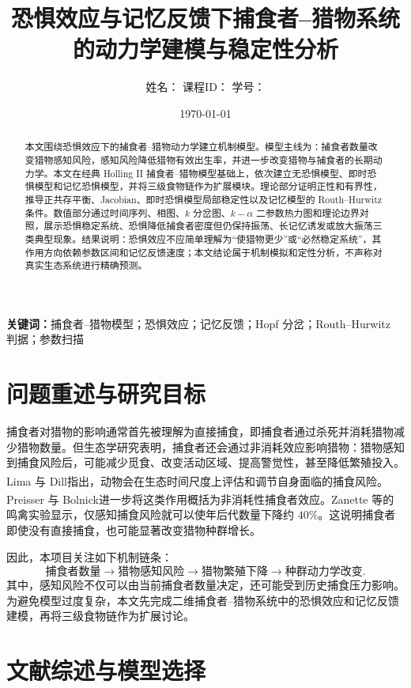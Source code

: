 \documentclass{article}
\title{\bfseries 恐惧效应与记忆反馈下捕食者--猎物系统的动力学建模与稳定性分析}
\author{姓名：\underline{\hspace{3cm}} \quad 课程ID：\underline{\hspace{2.5cm}} \quad 学号：\underline{\hspace{3cm}}}
\date{\today}
\newcommand{\upcite}[1]{\textsuperscript{\cite{#1}}}
\begin{document}
\maketitle

\begin{abstract}
本文围绕恐惧效应下的捕食者--猎物动力学建立机制模型。模型主线为：捕食者数量改变猎物感知风险，感知风险降低猎物有效出生率，并进一步改变猎物与捕食者的长期动力学。本文在经典 Holling II 捕食者--猎物模型基础上，依次建立无恐惧模型、即时恐惧模型和记忆恐惧模型，并将三级食物链作为扩展模块。理论部分证明正性和有界性，推导正共存平衡、Jacobian、即时恐惧模型局部稳定性以及记忆模型的 Routh--Hurwitz 条件。数值部分通过时间序列、相图、$k$ 分岔图、$k-\alpha$ 二参数热力图和理论边界对照，展示恐惧稳定系统、恐惧降低捕食者密度但仍保持振荡、长记忆诱发或放大振荡三类典型现象。结果说明：恐惧效应不应简单理解为“使猎物更少”或“必然稳定系统”，其作用方向依赖参数区间和记忆反馈速度；本文结论属于机制模拟和定性分析，不声称对真实生态系统进行精确预测。
\end{abstract}

\noindent\textbf{关键词：}捕食者--猎物模型；恐惧效应；记忆反馈；Hopf 分岔；Routh--Hurwitz 判据；参数扫描

\tableofcontents
\clearpage
\section{问题重述与研究目标}

捕食者对猎物的影响通常首先被理解为直接捕食，即捕食者通过杀死并消耗猎物减少猎物数量。但生态学研究表明，捕食者还会通过非消耗效应影响猎物：猎物感知到捕食风险后，可能减少觅食、改变活动区域、提高警觉性，甚至降低繁殖投入。Lima 与 Dill\upcite{lima1990behavioral}指出，动物会在生态时间尺度上评估和调节自身面临的捕食风险。Preisser 与 Bolnick\upcite{preisser2008many}进一步将这类作用概括为非消耗性捕食者效应。Zanette 等\upcite{zanette2011perceived}的鸣禽实验显示，仅感知捕食风险就可以使年后代数量下降约 $40\%$。这说明捕食者即使没有直接捕食，也可能显著改变猎物种群增长。

因此，本项目关注如下机制链条：
\[
\text{捕食者数量}
\longrightarrow
\text{猎物感知风险}
\longrightarrow
\text{猎物繁殖下降}
\longrightarrow
\text{种群动力学改变}.
\]
其中，感知风险不仅可以由当前捕食者数量决定，还可能受到历史捕食压力影响。为避免模型过度复杂，本文先完成二维捕食者--猎物系统中的恐惧效应和记忆反馈建模，再将三级食物链作为扩展讨论。

\section{文献综述与模型选择}
\end{document}
